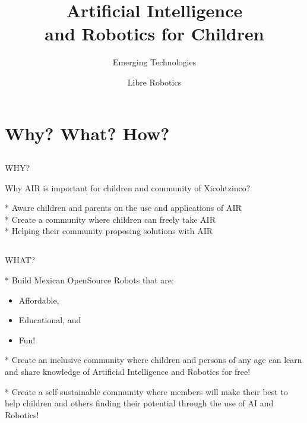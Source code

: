 \documentclass[compress]{beamer}
\title{Artificial Intelligence \\
and Robotics for Children}
\subtitle{Emerging Technologies}
\author{Libre Robotics}
\institute{Department of \\{\bf University of }}
\begin{document}



\closingtitle







\section{Why? What? How?}



\subsection{}
{
\begin{frame}{WHY?}

Why AIR is important for children and community of Xicohtzinco?

* Aware children and parents on the use and applications of AIR \\ 
* Create a community where children can freely take AIR  \\   
* Helping their community proposing solutions with AIR    \\




\end{frame}
}



\subsection{}
{
\begin{frame}{WHAT?}

* Build Mexican OpenSource Robots that are:
\begin{itemize}
        \item Affordable, 
	\item Educational, and 
	\item Fun!
\end{itemize}

* Create an inclusive community where children and persons of any age can
learn and share knowledge of Artificial Intelligence and
Robotics for free!

* Create a self-sustainable community where
members will make their best to help 
children and others finding their potential 
through the use of AI and Robotics! 

\end{frame}
}
\end{document}
